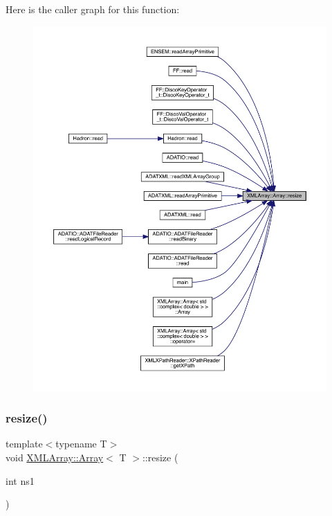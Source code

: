 Here is the caller graph for this function\+:\nopagebreak
\begin{figure}[H]
\begin{center}
\leavevmode
\includegraphics[width=350pt]{db/d6c/classXMLArray_1_1Array_a470913fde270ad0e578041654e2390f0_icgraph}
\end{center}
\end{figure}
\mbox{\label{classXMLArray_1_1Array_a470913fde270ad0e578041654e2390f0}} 
\subsubsection{\texorpdfstring{resize()}{resize()}\hspace{0.1cm}{\footnotesize\ttfamily [2/2]}}
{\footnotesize\ttfamily template$<$typename T$>$ \\
void \mbox{\hyperlink{classXMLArray_1_1Array}{X\+M\+L\+Array\+::\+Array}}$<$ T $>$\+::resize (\begin{DoxyParamCaption}\item[{int}]{ns1 }\end{DoxyParamCaption})\hspace{0.3cm}{\ttfamily [inline]}}




